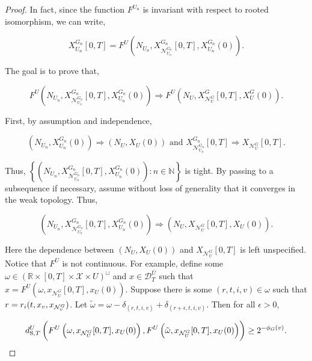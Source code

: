 \documentclass[12pt]{article}
\newcommand{\mb}{\mathbb}
\newcommand{\mc}{\mathcal}
\newcommand{\ov}{\overline}
\newcommand{\te}{\text}
\newcommand{\ep}{\epsilon}
\newcommand{\cad}{\mc{D}}							%
\newcommand{\sta}{\mc{X}}							%
\newcommand{\gneigh}[2]{\mc{N}^{#1}_{#2}}			%
\newcommand{\cl}[1]{\ov{#1}}						%
\newcommand{\Xf}{X}									%
\newcommand{\poiss}{N}								%
\newcommand{\rate}{r}								%
\newcommand{\stmet}[1]{
\ifstrempty{#1}{
	d_{\te{S}}}{
	d_{\te{S},#1}}}									%
\newcommand{\xf}{x}									%
\newcommand{\dpoiss}{\omega}						%
\newcommand{\poissv}[1]{_{#1}}						%
\newcommand{\vind}[1]{_{#1}}						%
\newcommand{\tme}[1]{(#1)}							%
\newcommand{\tmi}[1]{#1}							%
\newcommand{\gind}[1]{^{#1}}						%
\newcommand{\vpara}[1]{^{#1}}						%
\newcommand{\stpara}[1]{_{#1}}						%
\newcommand{\tpara}[1]{_{#1}}						%
\newcommand{\tmepro}[3]{
\ifstrempty{#3}{
	(#1,#2)}{
	(#1,#2,#3)}}									%
\newcommand{\alt}[1]{\tilde{#1}}					%
\renewcommand{\it}[1]{_{#1}}						%
\begin{document}
\begin{proof}
 In fact, since the function \(F\vpara{U\it{n}}\) is invariant with respect to rooted isomorphism, we can write,

\[\Xf\gind{G\it{n}}\vind{U\it{n}}\tmi{[0,T]} = F\vpara{U}\left(\poiss\poissv{U\it{n}}, \Xf\gind{G\it{n}}\vind{\gneigh{G\it{n}}{U\it{n}}}\tmi{[0,T]}, \Xf\gind{G\it{n}}\vind{U\it{n}}\tme{0}\right).\]

The goal is to prove that,

\[F\vpara{U}\left(\poiss\poissv{U\it{n}}, \Xf\gind{G\it{n}}\vind{\gneigh{G\it{n}}{U\it{n}}}\tmi{[0,T]}, \Xf\gind{G\it{n}}\vind{U\it{n}}\tme{0}\right) \Rightarrow F\vpara{U}\left(\poiss\poissv{U}, \Xf\gind{G}\vind{\gneigh{G}{U}}\tmi{[0,T]}, \Xf\gind{G}\vind{U}\tme{0}\right).\]

First, by assumption and independence,

\[\left(\poiss\poissv{U\it{n}},\Xf\gind{G\it{n}}\vind{U\it{n}}\tme{0}\right) \Rightarrow\left(\poiss\poissv{U},\Xf\vind{U}\tme{0}\right)\te{ and } \Xf\gind{G\it{n}}\vind{\gneigh{G\it{n}}{U\it{n}}}\tmi{[0,T]} \Rightarrow \Xf\vind{\gneigh{G}{U}}\tmi{[0,T]}.\]

Thus, \(\left\{\left(\poiss\poissv{U\it{n}},\Xf\gind{G\it{n}}\vind{\gneigh{G\it{n}}{U\it{n}}}\tmi{[0,T]},\Xf\gind{G\it{n}}\vind{U\it{n}}\tme{0}\right): n \in \mb{N}\right\}\) is tight. By passing to a subsequence if necessary, assume without loss of generality that it converges in the weak topology. Thus,

\[\left(\poiss\poissv{U\it{n}},\Xf\gind{G\it{n}}\vind{\gneigh{G\it{n}}{U\it{n}}}\tmi{[0,T]},\Xf\gind{G\it{n}}\vind{U\it{n}}\tme{0}\right) \Rightarrow \left(\poiss\poissv{U},\Xf\vind{\gneigh{G}{U}}\tmi{[0,T]},\Xf\vind{U}\tme{0}\right).\]

Here the dependence between \(\left(\poiss\poissv{U},\Xf\vind{U}\tme{0}\right)\) and \(\Xf\vind{\gneigh{G}{U}}\tmi{[0,T]}\) is left unspecified. Notice that \(F\vpara{U}\) is not continuous. For example, define some \(\dpoiss \in (\mb{R}\times [0,T] \times \sta \times U)^\sqcup\) and \(\xf\in \cad\vpara{\cl{U}}\tpara{T}\) such that \(\xf = F\vpara{U}(\omega,\xf\vind{\gneigh{G}{U}}\tmi{[0,T]},\xf\vind{U}\tme{0})\). Suppose there is some \((r,t,i,v) \in \dpoiss\) such that \(r = \rate\stpara{i}\tmepro{t}{\xf\vind{v}}{\xf\vind{\gneigh{G}{v}}}\). Let \(\alt{\dpoiss} = \dpoiss - \delta_{(r,t,i,v)} + \delta_{(r+\ep,t,i,v)}\). Then for all \(\ep > 0\),

\[\stmet{T}\vpara{U}\left(F\vpara{U}\left(\dpoiss,\xf\vind{\gneigh{G}{U}}\tmi{[0,T]},\xf\vind{U}\tme{0}\right), F\vpara{U}\left(\alt{\dpoiss},\xf\vind{\gneigh{G}{U}}\tmi{[0,T]},\xf\vind{U}\tme{0}\right)\right) \geq 2^{-\phi_G(v)}.\]


\end{proof}
\end{document}

